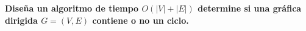 \textbf{
    Diseña un algoritmo de tiempo $O(|V|+|E|)$ determine si una gráfica dirigida 
    $G = (V,E)$ contiene o no un ciclo.
}\vspace{.2cm}
\textcolor{bibi}{}
\begin{quote}
\end{quote}